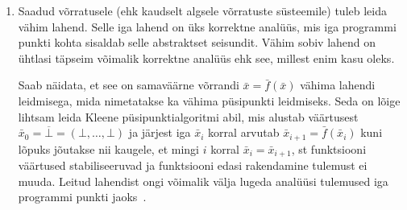 \documentclass[../thesis.tex]{subfiles}
\begin{document}
\begin{enumerate}
	\item Saadud võrratusele (ehk kaudselt algsele võrratuste süsteemile) tuleb leida vähim lahend. Selle iga lahend on üks korrektne analüüs, mis iga programmi punkti kohta sisaldab selle abstraktset seisundit. Vähim sobiv lahend on ühtlasi täpseim võimalik korrektne analüüs ehk see, millest enim kasu oleks.

	Saab näidata, et see on samaväärne võrrandi $\bar{x} = \bar{f}(\bar{x})$ vähima lahendi leidmisega, mida nimetatakse ka vähima püsipunkti leidmiseks. Seda on lõige lihtsam leida Kleene püsipunktialgoritmi abil, mis alustab väärtusest $\bar{x}_0 = \overline{\bot} = (\bot, \ldots, \bot)$ ja järjest iga $\bar{x}_i$ korral arvutab $\bar{x}_{i+1} = \bar{f}(\bar{x}_i)$ kuni lõpuks jõutakse nii kaugele, et mingi $i$ korral $\bar{x}_i = \bar{x}_{i+1}$, st funktsiooni väärtused stabiliseeruvad ja funktsiooni edasi rakendamine tulemust ei muuda. Leitud lahendist ongi võimalik välja lugeda analüüsi tulemused iga programmi punkti jaoks~\cite[21]{seidl_foundations}.
\end{enumerate}
\end{document}
